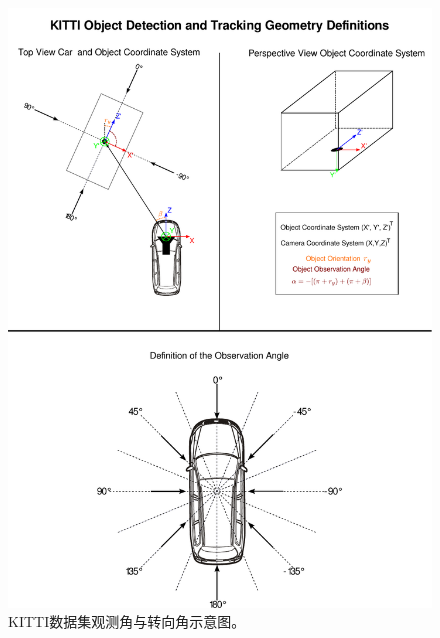 \begin{figure}[!t]
	\centering
	\begin{minipage}[t]{0.5\textwidth}
		\centering
		\includegraphics[trim={0cm, 15cm, 12cm, 2.5cm}, clip,width=\textwidth]{./imgs/KITTI_obj.pdf}
		\caption{KITTI数据集观测角与转向角示意图。}
		\label{fig:kitti_obj}
	\end{minipage}
	\begin{minipage}[t]{0.48\textwidth}
		\centering

\end{minipage}
\end{figure}
